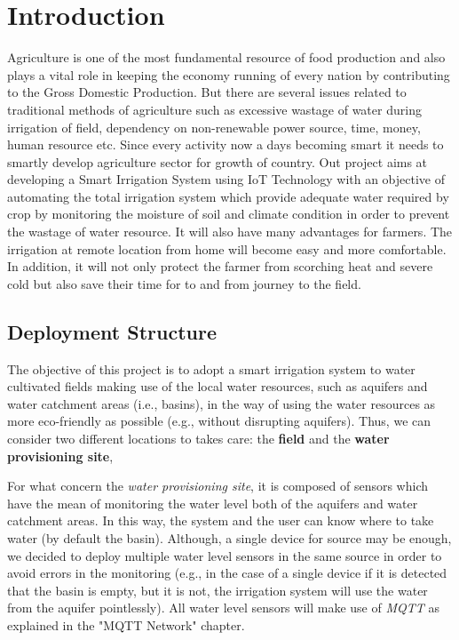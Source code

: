 \section{Introduction}
Agriculture is one of the most fundamental resource of food production and also plays a vital role in keeping the economy running of every nation by contributing to the Gross Domestic Production. But there are several issues related to traditional methods of agriculture such as excessive wastage of water during irrigation of field, dependency on non-renewable power source, time, money, human resource etc. Since every activity now a days becoming smart it needs to smartly develop agriculture sector for growth of country. Out project aims at developing a Smart Irrigation System using IoT Technology with an objective of automating the total irrigation system which provide adequate water required by crop by monitoring the moisture of soil and climate condition in order to prevent the wastage of water resource. It will also have many advantages for farmers. The irrigation at remote location from home will become easy and more comfortable. In addition, it will not only protect the farmer from scorching heat and severe cold but also save their time for to and from journey to the field.



\subsection{Deployment Structure}
The objective of this project is to adopt a smart irrigation system to water cultivated fields making use of the local water resources, such as aquifers and water catchment areas (i.e., basins), in the way of using the water resources as more eco-friendly as possible (e.g., without disrupting aquifers). Thus, we can consider two different locations to takes care: the \textbf{field} and the \textbf{water provisioning site},

For what concern the \textit{water provisioning site}, it is composed of sensors which have the mean of monitoring the water level both of the aquifers and water catchment areas. In this way, the system and the user can know where to take water (by default the basin). Although, a single device for source may be enough, we decided to deploy multiple water level sensors in the same source in order to avoid errors in the monitoring (e.g., in the case of a single device if it is detected that the basin is empty, but it is not, the irrigation system will use the water from the aquifer pointlessly).
All water level sensors will make use of \textit{MQTT} as explained in the "MQTT Network" chapter.



